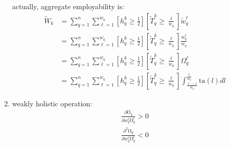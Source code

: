 \documentclass[hidelinks, nonatbib]{elsarticle}
\begin{document}
\begin{enumerate}
    actually, aggregate employability is:
    \begin{align}
        \tilde{W}_{k}
        &= 
        \sum_{q=1}^{n}
        \sum_{\ell=1}^{w_q}
        \left[
            h_{q}^{k}
            \geq
            \frac{1}{2}
        \right]
        \left[
            \tilde{T}_{q}^{k}
            \geq
            \frac{\ell}{w_q}
        \right]
        \tilde{w}_{q}^{\ell}
        \\&= 
        \sum_{q=1}^{n}
        \sum_{\ell=1}^{w_q}
        \left[
            h_{q}^{k}
            \geq
            \frac{1}{2}
        \right]
        \left[
            \tilde{T}_{q}^{k}
            \geq
            \frac{\ell}{w_q}
        \right]
        \frac{
            w_{q}^{\ell}
        }{
            w_q
        }
        \\&= 
        \sum_{q=1}^{n}
        \sum_{\ell=1}^{w_q}
        \left[
            h_{q}^{k}
            \geq
            \frac{1}{2}
        \right]
        \left[
            \tilde{T}_{q}^{k}
            \geq
            \frac{\ell}{w_q}
        \right]
        \Omega_{q}^{\ell}
        \\&= 
        \sum_{q=1}^{n}
        \sum_{\ell=1}^{w_q}
        \left[
            h_{q}^{k}
            \geq
            \frac{1}{2}
        \right]
        \left[
            \tilde{T}_{q}^{k}
            \geq
            \frac{\ell}{w_q}
        \right]
        \int_{
            \frac{\ell - 1}{w_q}
        }^{
            \frac{\ell}{w_q}
        }
        \text{ta}(l)dl
    \end{align}

    \item weakly holistic operation:
    \begin{gather}
        \frac{
            \partial
            \mho_q
        }{
            \partial
            w_{q}^{\ell}
            \mho_{q}^{\ell}
        }
        > 0
        \\
        \frac{
            \partial ^ 2
            \mho_q
        }{
            \partial
            w_{q}^{\ell}
            \mho_{q}^{\ell}
        }
        < 0
    \end{gather}
\end{enumerate}

\end{document}
